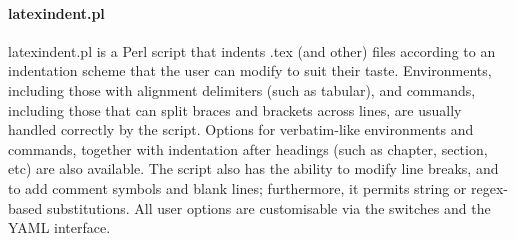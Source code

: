 \paragraph{latexindent.pl}
latexindent.pl is a Perl script that indents .tex (and other) files according to an indentation scheme that the user can modify to suit their taste.
Environments, including those with alignment delimiters (such as tabular), and commands, including those that can split braces and brackets across lines, are usually handled correctly by the script.
Options for verbatim-like environments and commands, together with indentation after headings (such as chapter, section, etc) are also available.
The script also has the ability to modify line breaks, and to add comment symbols and blank lines;
furthermore, it permits string or regex-based substitutions.
All user options are customisable via the switches and the YAML interface.
